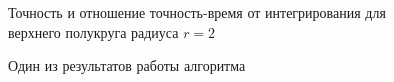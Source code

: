 \documentclass[a4paper, 12pt]{article}
\begin{document}
  
    \begin{figure}[h!]
      \noindent{}
      \caption{Точность и отношение точность-время от интегрирования для верхнего полукруга радиуса $r=2$}
      \label{hcirc2}
      \end{figure} 

      \begin{figure}[h] 
        \vfill 
        \caption{Один из результатов работы алгоритма} 
        \label{hexampl2} 
        \end{figure}     
        
\end{document}
